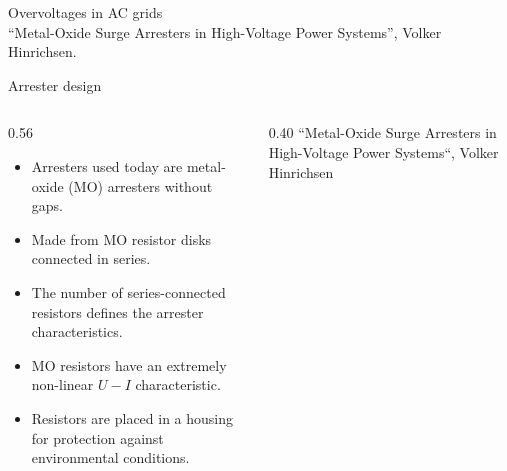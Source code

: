 
\begin{frame}{Overvoltages in AC grids}
  \centering
  \\[0.3em]
  {\color{atGray}\footnotesize ``Metal-Oxide Surge Arresters in High-Voltage
  Power Systems'', Volker Hinrichsen.}
\end{frame}

\begin{frame}{Arrester design}
  \begin{columns}[c,onlytextwidth]
    \begin{column}{0.56\textwidth}
      \begin{itemize}
        \setlength{\itemsep}{0.4em}
        \item Arresters used today are metal-oxide (MO) arresters without gaps.
        \item Made from MO resistor disks connected in series.
        \item The number of series-connected resistors defines the arrester
              characteristics.
        \item MO resistors have an extremely non-linear $U-I$ characteristic.
        \item Resistors are placed in a housing for protection against
              environmental conditions.
      \end{itemize}
    \end{column}
    \begin{column}{0.40\textwidth}
      \centering
      {\color{atGray}\footnotesize ``Metal-Oxide Surge Arresters in High-Voltage Power Systems``, Volker Hinrichsen}
    \end{column}
  \end{columns}
\end{frame}

